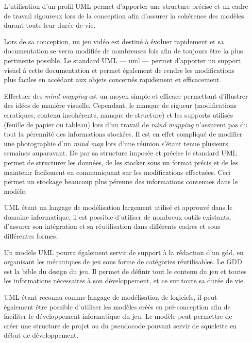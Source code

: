 L'utilisation d'un profil UML permet d'apporter une structure précise et un cadre de travail rigoureux lors de la conception afin d'assurer la cohérence des modèles durant toute leur durée de vie.

Lors de sa conception, un jeu vidéo est destiné à évoluer rapidement et sa documentation se verra modifiée de nombreuses fois afin de toujours être la plus pertinente possible.
Le standard UML --- \gls{uml} --- permet d'apporter un support visuel à cette documentation et permet également de rendre les modifications plus faciles en accédant aux objets concernés rapidement et efficacement. 

Effectuer des \emph{mind mapping} est un moyen simple et efficace permettant d'illustrer des idées de manière visuelle.
Cependant, le manque de rigueur (modifications erratiques, contenu incohérents, manque de structure) et les supports utilisés (feuille de papier ou tableau) lors d'un travail de \emph{mind mapping} n'assurent pas du tout la pérennité des informations stockées.
Il est en effet compliqué de modifier une photographie d'un \emph{mind map} lors d'une réunion s'étant tenue plusieurs semaines auparavant.
De par sa structure imposée et précise le standard UML permet de structurer les données, de les stocker sous un format précis et de les maintenir facilement en communiquant sur les modifications effectuées.
Ceci permet un stockage beaucoup plus pérenne des informations contenues dans le modèle.



UML étant un langage de modélisation largement utilisé et approuvé dans le domaine informatique, il est possible d'utiliser de nombreux outils existants, d'assurer son intégration et sa réutilisation dans différents cadres et sous différentes formes.

Un modèle UML pourra également servir de support à la rédaction d'un \gls{gdd}, en organisant les mécaniques de jeu sous forme de catégories réutilisables.
Le GDD est la \guillemotleft bible du design \guillemotright \cite{GD_foundations_pedersen} du jeu.
Il permet de définir tout le contenu du jeu et toutes les informations nécessaires à son développement, et ce sur toute sa durée de vie. 

UML étant reconnu comme langage de modélisation de logiciels, il peut également être possible d'utiliser les modèles créés en pré-conception afin de faciliter le développement informatique du jeu.
Le modèle peut permettre de créer une structure de projet ou du pseudocode pouvant servir de squelette en début de développement.


